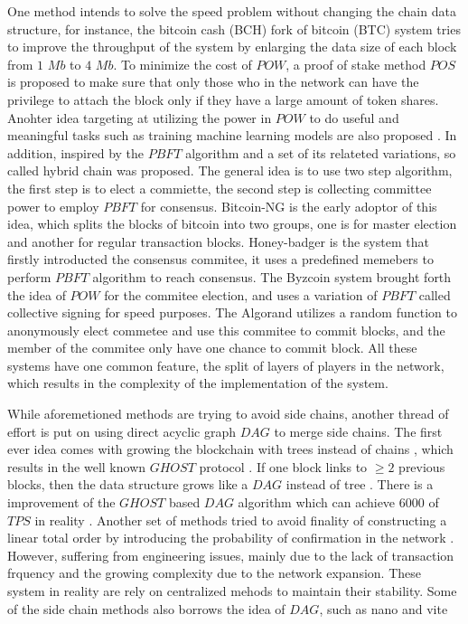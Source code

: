 One method intends to solve the speed problem without changing the chain data structure, for instance, 
the bitcoin cash (BCH) fork of bitcoin (BTC) system tries to improve the throughput of the system by enlarging the data size of each block from $1$ $Mb$ to $4$ $Mb$. 
To minimize the cost of $POW$, a proof of stake method $POS$ \cite{wood2014ethereum} is proposed to make sure that only those who in the network can have the privilege to attach the block only if they have a large amount of token shares.
Anohter idea targeting at utilizing the power in $POW$ to do useful and meaningful tasks such as training machine learning models are also proposed \cite{matthew2017aion}.
In addition, inspired by the $PBFT$ algorithm \cite{castro1999practical} and a set of its relateted variations, so called hybrid chain was proposed. 
The general idea is to use two step algorithm, the first step is to elect a commiette, the second step is collecting committee power to employ $PBFT$ for consensus.
Bitcoin-NG \cite{eyal2016bitcoin} is the early adoptor of this idea, which splits the blocks of bitcoin into two groups, one is for master election and another for regular transaction blocks. 
Honey-badger \cite{miller2016honey} is the system that firstly introducted the consensus commitee, it uses a predefined memebers to perform $PBFT$ algorithm to reach consensus.  
The Byzcoin system \cite{kogias2016enhancing} brought forth the idea of $POW$ for the commitee election, and uses a variation of $PBFT$ called collective signing for speed purposes.
The Algorand \cite{gilad2017algorand} utilizes a random function to anonymously elect commetee and use this commitee to commit blocks, and the member of the commitee only have one chance to commit block.
All these systems have one common feature, the split of layers of players in the network, which results in the complexity of the implementation of the system.

While aforemetioned methods are trying to avoid side chains, another thread of effort is put on using direct acyclic graph $DAG$ to merge side chains.
The first ever idea comes with growing the blockchain with trees instead of chains \cite{sompolinsky2013accelerating}, which results in the well known $GHOST$ protocol \cite{sompolinsky2015secure}.
If one block links to $\geq 2$ previous blocks, then the data structure grows like a $DAG$ instead of tree \cite{sompolinsky2016spectre, sompolinskyphantom}.
There is a improvement of the $GHOST$ based $DAG$ algorithm which can achieve $6000$ of $TPS$ in reality \cite{li2018scaling}.
Another set of methods tried to avoid finality of constructing a linear total order by introducing the probability of confirmation in the network \cite{popov2016tangle, churyumov2016byteball}. 
However, suffering from engineering issues, mainly due to the lack of transaction frquency and the growing complexity due to the network expansion.
These system in reality are rely on centralized mehods to maintain their stability.
Some of the side chain methods also borrows the idea of $DAG$, such as nano \cite{lemahieu2018nano} and vite \cite{liuvite}

